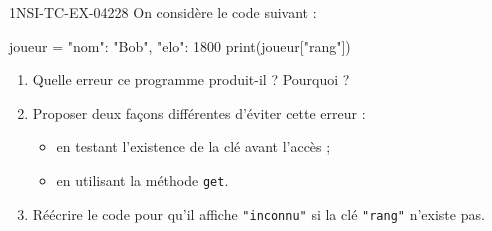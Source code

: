 \begin{exercice}{1NSI-TC-EX-042}{2}{8}
On considère le code suivant :
\begin{python}
joueur = {"nom": "Bob", "elo": 1800}
print(joueur["rang"])
\end{python}
\begin{enumerate}
  \item Quelle erreur ce programme produit-il ? Pourquoi ?
  \item Proposer deux façons différentes d'éviter cette erreur :
        \begin{itemize}
          \item en testant l'existence de la clé avant l'accès ;
          \item en utilisant la méthode \lstinline{get}.
        \end{itemize}
  \item Réécrire le code pour qu'il affiche \lstinline{"inconnu"} si la clé
        \lstinline{"rang"} n'existe pas.
\end{enumerate}
\end{exercice}
